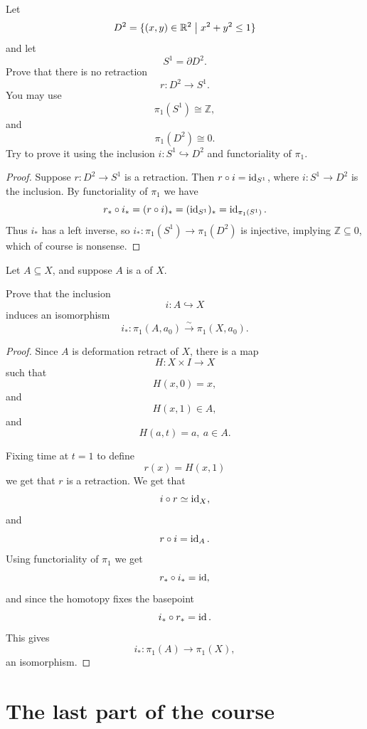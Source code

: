 \documentclass[11pt]{article}
\begin{document}
\begin{prob}
    Let 
    \[
        D^2 = \{(x,y) \in \mathbb R^2 \bigm| 
        x^2 + y^2 \leq 1\} 
    \]
    and let 
    \[
        S^1 = \partial D^2. 
    \]
    Prove that there is no retraction 
    \[
        r : D^2 \to S^1. 
    \]
    You may use 
    \[
        \pi_1(S^1) \cong \mathbb Z, 
    \]
    and 
    \[
        \pi_1(D^2) \cong 0. 
    \]
    Try to prove it using the inclusion $i : 
    S^1 \hookrightarrow D^2$ and functoriality of 
    $\pi_1$. 
\end{prob}
\begin{proof}
    Suppose $r : D^2 \to S^1$ is a retraction. 
    Then $r \circ i = \operatorname{id}_{S^1}$, where $i: S^1 
    \to D^2$ is the 
    inclusion. 
    By functoriality of $\pi_1$ we have 
    \[
        r_* \circ i_* 
        = (r \circ i)_* = (\operatorname{id}_{S^1})_* 
        = \operatorname{id}_{\pi_1(S^1)}. 
    \]  
    Thus $i_*$ has a left inverse, so 
    $i_* : \pi_1(S^1) \to \pi_1(D^2)$ is injective, 
    implying $\mathbb Z \subseteq 0$, which of course 
    is nonsense.
\end{proof}

\begin{prob}
    Let $A \subseteq X$, and suppose $A$ is 
    a  of $X$. 

    Prove that the inclusion 
    \[
        i : A \hookrightarrow X 
    \]
    induces an isomorphism 
    \[
        i_* : \pi_1(A,a_0)
        \overset\sim\longrightarrow \pi_1(X,a_0). 
    \]
\end{prob}
\begin{proof}
    Since $A$ is deformation retract of $X$, there is 
    a map 
    \[
        H : X \times I \to X 
    \]
    such that 
    \[
        H(x,0) = x, 
    \]
    and 
    \[
        H(x,1) \in A,  
    \]
    and 
    \[
        H(a,t) = a, \ a \in A. 
    \]

    Fixing time at $t = 1$ to define 
    \[
        r(x) = H(x,1) 
    \]
    we get that $r$ is a retraction. 
    We get that 
    \[
        i \circ r \simeq \operatorname{id}_X, 
    \]
    and 
    \[
        r \circ i = \operatorname{id}_A. 
    \]
    Using functoriality of $\pi_1$ we get 
    \[
        r_* \circ i_* = \operatorname{id}, 
    \]
    and since the homotopy fixes the basepoint 
    \[
        i_* \circ r_* = \operatorname{id}.  
    \]
    This gives 
    \[
        i_* : \pi_1(A) \to \pi_1(X), 
    \]
    an isomorphism. 
\end{proof}

\section{The last part of the course}
\end{document}
